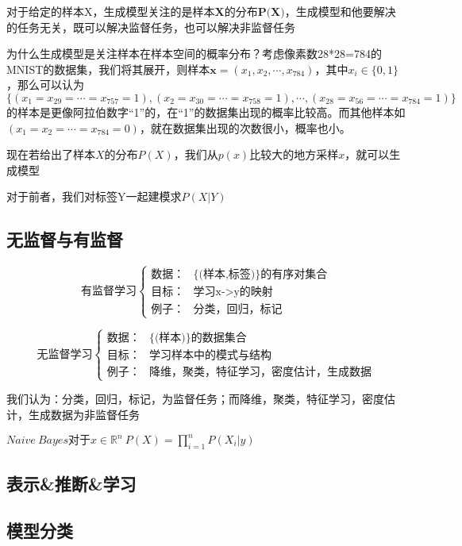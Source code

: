 \documentclass[12pt, a4paper, oneside]{ctexart}
\begin{document}
\par
对于给定的样本X，生成模型关注的是$\textbf{样本X的分布P(X)}$，生成模型和他要解决的任务无关，既可以解决监督任务，也可以解决非监督任务
\par
为什么生成模型是关注样本在样本空间的概率分布？考虑像素数28*28=784的MNIST的数据集，我们将其展开，则样本$\boldsymbol{x}=(x_1,x_2,\cdots,x_784)$，其中$x_i\in \{0,1\}$，那么可以认为$\{(x_1=x_{29}=\cdots=x_{757}=1),(x_2=x_{30}=\cdots=x_{758}=1),\cdots,(x_{28}=x_{56}=\cdots=x_{784}=1)\}$的样本是更像阿拉伯数字“1”的，在“1”的数据集出现的概率比较高。而其他样本如$(x_1=x_2=\cdots=x_{784}=0)$，就在数据集出现的次数很小，概率也小。
\par 
现在若给出了样本$X$的分布$P(X)$，我们从$p(x)$比较大的地方采样$x$，就可以生成模型
\par
对于前者，我们对标签Y一起建模求$P(X|Y)$
\subsection{无监督与有监督}
$$ \mbox{有监督学习}\left\{
\begin{aligned}
\mbox{数据：}&\mbox{\{(样本,标签)\}的有序对集合}\\
\mbox{目标：}&\mbox{学习x->y的映射} \\
\mbox{例子：}&\mbox{分类，回归，标记} 
\end{aligned}
\right.
$$

$$ \mbox{无监督学习}\left\{
\begin{aligned}
\mbox{数据：}&\mbox{\{(样本)\}的数据集合}\\
\mbox{目标：}&\mbox{学习样本中的模式与结构} \\
\mbox{例子：}&\mbox{降维，聚类，特征学习，密度估计，生成数据} 
\end{aligned}
\right.
$$

\par
我们认为：分类，回归，标记，为监督任务；而降维，聚类，特征学习，密度估计，生成数据为非监督任务
\par
$Naive\ Bayes 对于x\in\mathbb{R}^n\ P(X)= \prod_{i=1}^{n}P(X_i|y)$
\subsection{表示\&推断\&学习}
\subsection{模型分类}
\end{document}
